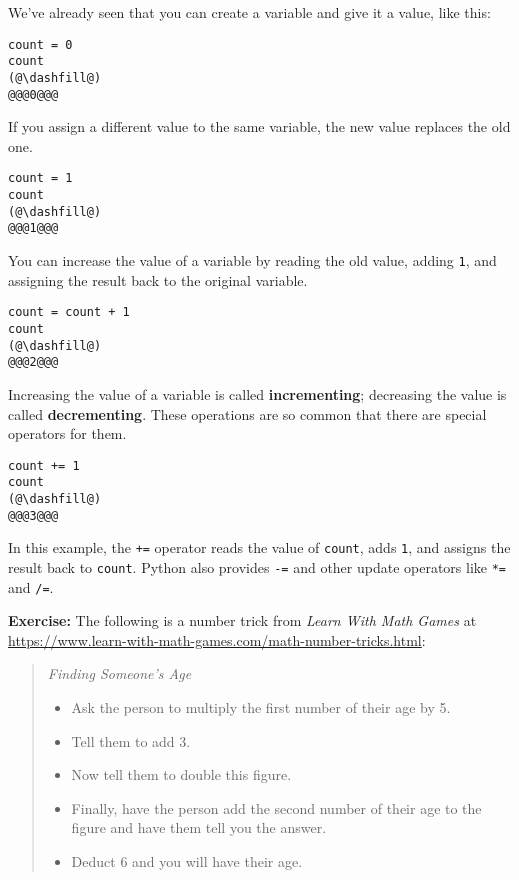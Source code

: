 We've already seen that you can create a variable and give it a value,
like this:

\begin{lstlisting}[]
count = 0
count
(@\dashfill@)
@@@0@@@
\end{lstlisting}

If you assign a different value to the same variable, the new value
replaces the old one.

\begin{lstlisting}[]
count = 1
count
(@\dashfill@)
@@@1@@@
\end{lstlisting}

You can increase the value of a variable by reading the old value,
adding \passthrough{\lstinline!1!}, and assigning the result back to the
original variable.

\begin{lstlisting}[]
count = count + 1
count
(@\dashfill@)
@@@2@@@
\end{lstlisting}

Increasing the value of a variable is called \textbf{incrementing};
decreasing the value is called \textbf{decrementing}. These operations
are so common that there are special operators for them.

\begin{lstlisting}[]
count += 1
count
(@\dashfill@)
@@@3@@@
\end{lstlisting}

In this example, the \passthrough{\lstinline!+=!} operator reads the
value of \passthrough{\lstinline!count!}, adds
\passthrough{\lstinline!1!}, and assigns the result back to
\passthrough{\lstinline!count!}. Python also provides
\passthrough{\lstinline!-=!} and other update operators like
\passthrough{\lstinline!*=!} and \passthrough{\lstinline!/=!}.

\textbf{Exercise:} The following is a number trick from \emph{Learn With
Math Games} at
\url{https://www.learn-with-math-games.com/math-number-tricks.html}:

\begin{quote}
\emph{Finding Someone's Age}

\begin{itemize}
\item
  Ask the person to multiply the first number of their age by 5.
\item
  Tell them to add 3.
\item
  Now tell them to double this figure.
\item
  Finally, have the person add the second number of their age to the
  figure and have them tell you the answer.
\item
  Deduct 6 and you will have their age.
\end{itemize}
\end{quote}

